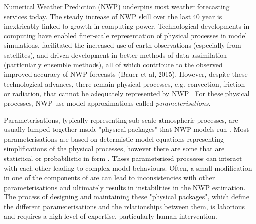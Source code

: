 \documentclass[twocol]{ametsoc}
\begin{document}
Numerical Weather Prediction (NWP) underpins most weather forecasting services today. The steady increase of NWP skill over the last 40 year is inextricably linked to growth in computing power. Technological developments in computing have enabled finer-scale representation of physical processes in model simulations, facilitated the increased use of earth observations (especially from satellites), and driven development in better methods of data assimilation (particularly ensemble methods), all of which contribute to the observed improved accuracy of NWP forecasts (Bauer et al, 2015). However, despite these technological advances, there remain physical processes, e.g. convection, friction or radiation, that cannot be adequately represented by NWP \citep{stensrud2009parameterization}. For these physical processes, NWP use model approximations called \emph{parameterisations}.

Parameterisations, typically representing sub-scale atmospheric processes, are usually lumped together inside "physical packages" that NWP models run \citep{LTG-81}. Most parameterisations are based on determistic model equations representing simplifications of the physical processes, however there are some that are statistical or probabilistic in form \citep{berner2017stochastic}. These parameterised processes can interact with each other leading to complex model behaviours.  Often, a small modification in one of the components of are can lead to inconsistencies with other parameterisations and ultimately results in instabilities in the NWP estimation. The process of designing and maintaining these "physical packages", which define the different parameterisations and the relationships between them, is laborious and requires a high level of expertise, particularly human intervention.
\end{document}
